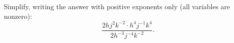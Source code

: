 Simplify, writing the answer with positive exponents only (all variables are nonzero):
\[
\dfrac{2hj^2k^{-2}\cdot h^4j^{-1}k^4}{2h^{-3}j^{-4}k^{-2}}.
\]

